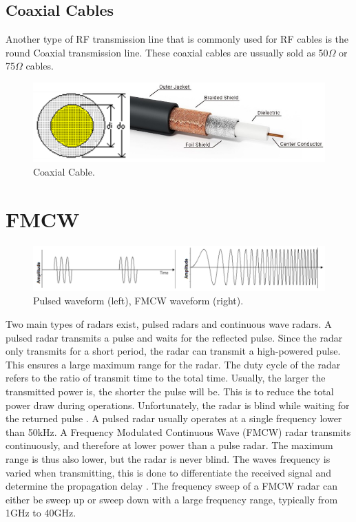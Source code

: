 \subsection{Coaxial Cables}
Another type of RF transmission line that is commonly used for RF cables is the round Coaxial transmission line. These coaxial cables are ussually sold as 50$\Omega$ or 75$\Omega$ cables.

    \begin{figure}[H]
    \centering
    \includegraphics[width=0.7\linewidth]{Figures/chp2_coaxial_cable.png}
    \caption{Coaxial Cable.}
    \label{fig:chp2_coaxial_cable}
    \end{figure}

\section{FMCW}

    \begin{figure}[H]
    \centering
    \includegraphics[width=1\linewidth]{Figures/chp2_FMCW.png}
    \caption{Pulsed waveform (left), FMCW waveform (right).}
    \label{fig:chp2_FMCW}
    \end{figure}
    
Two main types of radars exist, pulsed radars and continuous wave radars. A pulsed radar transmits a pulse and waits for the reflected pulse. Since the radar only transmits for a short period, the radar can transmit a high-powered pulse. This ensures a large maximum range for the radar. The duty cycle of the radar refers to the ratio of transmit time to the total time. Usually, the larger the transmitted power is, the shorter the pulse will be. This is to reduce the total power draw during operations. Unfortunately, the radar is blind while waiting for the returned pulse \cite{FMCW}. A pulsed radar usually operates at a single frequency lower than 50kHz. A Frequency Modulated Continuous Wave (FMCW) radar transmits continuously, and therefore at lower power than a pulse radar. The maximum range is thus also lower, but the radar is never blind. The waves frequency is varied when transmitting, this is done to differentiate the received signal and determine the propagation delay \cite{FMCW}. The frequency sweep of a FMCW radar can either be sweep up or sweep down with a large frequency range, typically from 1GHz to 40GHz.

